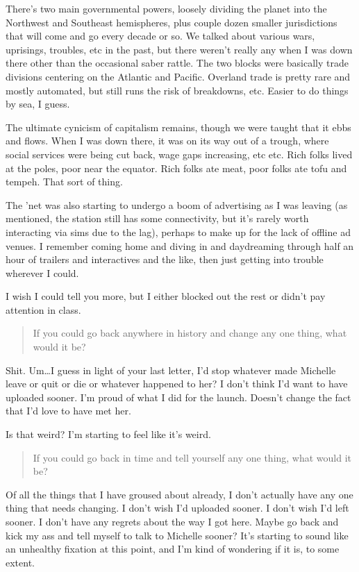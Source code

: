 There's two main governmental powers, loosely dividing the planet into the Northwest and Southeast hemispheres, plus couple dozen smaller jurisdictions that will come and go every decade or so. We talked about various wars, uprisings, troubles, etc in the past, but there weren't really any when I was down there other than the occasional saber rattle. The two blocks were basically trade divisions centering on the Atlantic and Pacific. Overland trade is pretty rare and mostly automated, but still runs the risk of breakdowns, etc. Easier to do things by sea, I guess.

The ultimate cynicism of capitalism remains, though we were taught that it ebbs and flows. When I was down there, it was on its way out of a trough, where social services were being cut back, wage gaps increasing, etc etc. Rich folks lived at the poles, poor near the equator. Rich folks ate meat, poor folks ate tofu and tempeh. That sort of thing.

The 'net was also starting to undergo a boom of advertising as I was leaving (as mentioned, the station still has some connectivity, but it's rarely worth interacting via sims due to the lag), perhaps to make up for the lack of offline ad venues. I remember coming home and diving in and daydreaming through half an hour of trailers and interactives and the like, then just getting into trouble wherever I could.

I wish I could tell you more, but I either blocked out the rest or didn't pay attention in class.

\begin{quote}
If you could go back anywhere in history and change any one thing, what would it be?
\end{quote}

\noindent Shit. Um\ldots I guess in light of your last letter, I'd stop whatever made Michelle leave or quit or die or whatever happened to her? I don't think I'd want to have uploaded sooner. I'm proud of what I did for the launch. Doesn't change the fact that I'd love to have met her.

Is that weird? I'm starting to feel like it's weird.

\begin{quote}
If you could go back in time and tell yourself any one thing, what would it be?
\end{quote}

\noindent Of all the things that I have groused about already, I don't actually have any one thing that needs changing. I don't wish I'd uploaded sooner. I don't wish I'd left sooner. I don't have any regrets about the way I got here. Maybe go back and kick my ass and tell myself to talk to Michelle sooner? It's starting to sound like an unhealthy fixation at this point, and I'm kind of wondering if it is, to some extent.

